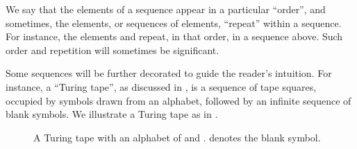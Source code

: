 We say that the elements of a sequence appear in a particular ``order'', and
sometimes, the elements, or sequences of elements, ``repeat'' within a
sequence. For instance, the elements  and  repeat, in that
order, in a sequence above. Such order and repetition will sometimes be
significant.

Some sequences will be further decorated to guide the reader's intuition. For
instance, a ``Turing tape'', as discussed in
, is a sequence of tape squares, occupied
by symbols drawn from an alphabet, followed by an infinite sequence of blank
symbols. We illustrate a Turing tape as in .
 
\begin{figure}[h!]
\centering
{}
\caption[]{A Turing tape with an alphabet of  and .
\blank{} denotes the blank symbol.}
\label{fig:informal-turing-tape}
\end{figure}

